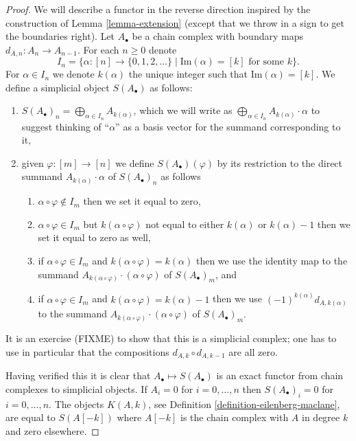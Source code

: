 \begin{proof}
We will describe a functor in the reverse direction
inspired by the construction of Lemma \ref{lemma-extension}
(except that we throw in a sign to get the boundaries
right). Let $A_\bullet$ be a chain complex with boundary maps
$d_{A, n} : A_n \to A_{n - 1}$. For each $n \geq 0$ denote
$$
I_n =
\Big\{
\alpha : [n] \to \{0, 1, 2, \ldots\}
\mid
\text{Im}(\alpha) = [k]\text{ for some }k
\Big\}.
$$
For $\alpha \in I_n$ we denote $k(\alpha)$ the unique
integer such that $\text{Im}(\alpha) = [k]$.
We define a simplicial object $S(A_\bullet)$ as follows:
\begin{enumerate}
\item $S(A_\bullet)_n = \bigoplus_{\alpha \in I_n} A_{k(\alpha)}$, which
we will write as
$\bigoplus_{\alpha \in I_n} A_{k(\alpha)} \cdot \alpha$
to suggest thinking of ``$\alpha$'' as a basis vector for the
summand corresponding to it,
\item given $\varphi : [m] \to [n]$ we define
$S(A_\bullet)(\varphi)$ by its restriction to
the direct summand $A_{k(\alpha)} \cdot \alpha$
of $S(A_\bullet)_n$ as follows
\begin{enumerate}
\item $\alpha \circ \varphi \not \in I_m$ then we set it equal to zero,
\item $\alpha \circ \varphi \in I_m$ but $k(\alpha \circ \varphi)$
not equal to either $k(\alpha)$ or $k(\alpha) - 1$ then we set it
equal to zero as well,
\item if $\alpha \circ \varphi \in I_m$
and $k(\alpha \circ \varphi) = k(\alpha)$ then we use
the identity map to the summand
$A_{k(\alpha \circ \varphi)} \cdot (\alpha \circ \varphi)$
of $S(A_\bullet)_m$, and
\item if $\alpha \circ \varphi \in I_m$
and $k(\alpha \circ \varphi) = k(\alpha) - 1$
then we use $(-1)^{k(\alpha)} d_{A, k(\alpha)}$ to the summand
$A_{k(\alpha \circ \varphi)}\cdot (\alpha \circ \varphi)$
of $S(A_\bullet)_m$.
\end{enumerate}
\end{enumerate}
It is an exercise (FIXME) to show that
this is a simplicial complex; one has to use in particular that
the compositions $d_{A, k} \circ d_{A, k - 1}$ are all zero.

\medskip\noindent
Having verified this it is clear that $A_\bullet \mapsto
S(A_\bullet)$ is an exact functor from chain complexes
to simplicial objects. If $A_i = 0$ for $i = 0, \ldots, n$
then $S(A_\bullet)_i = 0$ for $i = 0, \ldots, n$.
The objects $K(A, k)$, see Definition \ref{definition-eilenberg-maclane},
are equal to $S(A[-k])$ where $A[-k]$ is the chain complex
with $A$ in degree $k$ and zero elsewhere.


\end{proof}
